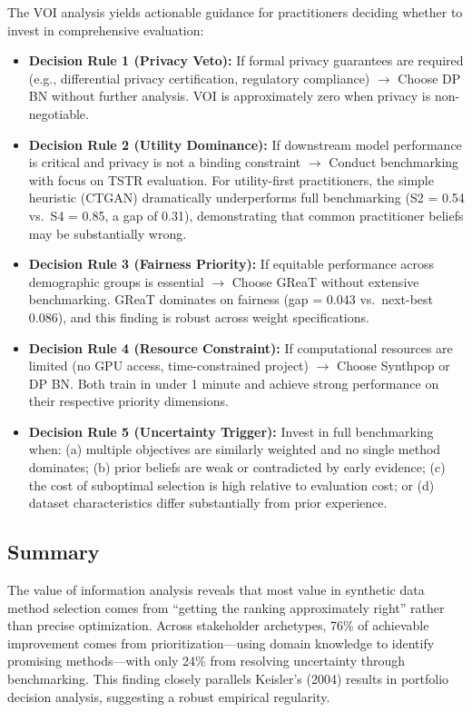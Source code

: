 \documentclass[12pt,a4paper]{article}
\begin{document}
The VOI analysis yields actionable guidance for practitioners deciding whether to invest in comprehensive evaluation:

\begin{itemize}
    \item \textbf{Decision Rule 1 (Privacy Veto):} If formal privacy guarantees are required (e.g., differential privacy certification, regulatory compliance) $\rightarrow$ Choose DP BN without further analysis. VOI is approximately zero when privacy is non-negotiable.
    
    \item \textbf{Decision Rule 2 (Utility Dominance):} If downstream model performance is critical and privacy is not a binding constraint $\rightarrow$ Conduct benchmarking with focus on TSTR evaluation. For utility-first practitioners, the simple heuristic (CTGAN) dramatically underperforms full benchmarking (S2 = 0.54 vs.\ S4 = 0.85, a gap of 0.31), demonstrating that common practitioner beliefs may be substantially wrong.
    
    \item \textbf{Decision Rule 3 (Fairness Priority):} If equitable performance across demographic groups is essential $\rightarrow$ Choose GReaT without extensive benchmarking. GReaT dominates on fairness (gap = 0.043 vs.\ next-best 0.086), and this finding is robust across weight specifications.
    
    \item \textbf{Decision Rule 4 (Resource Constraint):} If computational resources are limited (no GPU access, time-constrained project) $\rightarrow$ Choose Synthpop or DP BN. Both train in under 1 minute and achieve strong performance on their respective priority dimensions.
    
    \item \textbf{Decision Rule 5 (Uncertainty Trigger):} Invest in full benchmarking when: (a) multiple objectives are similarly weighted and no single method dominates; (b) prior beliefs are weak or contradicted by early evidence; (c) the cost of suboptimal selection is high relative to evaluation cost; or (d) dataset characteristics differ substantially from prior experience.
\end{itemize}

\subsection{Summary}

The value of information analysis reveals that most value in synthetic data method selection comes from ``getting the ranking approximately right'' rather than precise optimization. Across stakeholder archetypes, 76\% of achievable improvement comes from prioritization---using domain knowledge to identify promising methods---with only 24\% from resolving uncertainty through benchmarking. This finding closely parallels Keisler's (2004) results in portfolio decision analysis, suggesting a robust empirical regularity.
\end{document}
